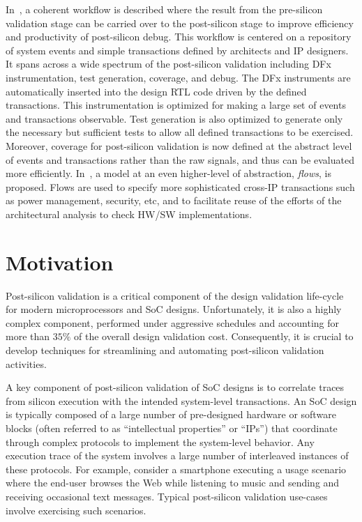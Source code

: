 \documentclass[12pt,frontmatter,copyright,thesis]{usfmanus}
\begin{document}
In~\cite{Singerman2011DAC}, a coherent workflow is described
where the result from the pre-silicon validation stage can
be carried over to the post-silicon stage to improve
efficiency and productivity of post-silicon debug.  This
workflow is centered on a repository of system events and
simple transactions defined by architects and IP designers.
It spans across a wide spectrum of the post-silicon
validation including DFx instrumentation, test generation,
coverage, and debug.  The DFx instruments are automatically
inserted into the design RTL code driven by the defined
transactions.  This instrumentation is optimized for making
a large set of events and transactions observable.  Test
generation is also optimized to generate only the necessary
but sufficient tests to allow all defined transactions to be
exercised.  Moreover, coverage for post-silicon validation
is now defined at the abstract level of events and
transactions rather than the raw signals, and thus can be
evaluated more efficiently.  In~\cite{Abarbanel2014DAC}, a
model at an even higher-level of abstraction, {\em flows},
is proposed.  Flows are used to specify more sophisticated
cross-IP transactions such as power management, security,
etc, and to facilitate reuse of the efforts of the
architectural analysis to check HW/SW implementations.




\section{Motivation}

Post-silicon validation is a critical
component of the design validation life-cycle for modern
microprocessors and SoC designs.  Unfortunately, it is also
a highly complex component, performed under aggressive
schedules and accounting for more than $35\%$ of the overall
design validation cost.  Consequently, it
is crucial to develop techniques for streamlining and
automating post-silicon validation activities.

A key component of post-silicon validation of SoC designs is
to correlate traces from silicon execution with the intended
system-level transactions.  An SoC design is typically
composed of a large number of pre-designed hardware or
software blocks (often referred to as ``intellectual
properties'' or ``IPs'') that coordinate through complex
protocols to implement the system-level behavior.  Any
execution trace of the system involves a large number of
interleaved instances of these protocols.  For example,
consider a smartphone executing a usage scenario where the
end-user browses the Web while listening to music and
sending and receiving occasional text messages. Typical
post-silicon validation use-cases involve exercising such
scenarios. 
\end{document}

